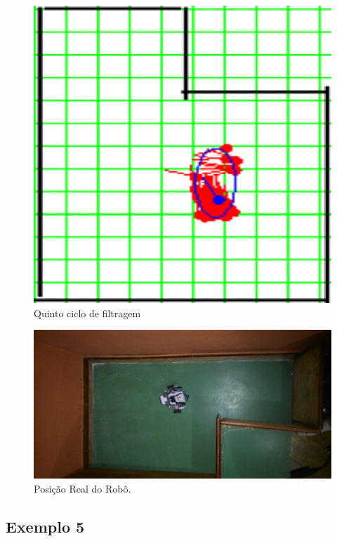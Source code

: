 \begin{figure}[H]
  \centering
  \includegraphics[scale=0.6]{figuras/cen1_ex4/6.eps}
  \caption[Quinto Ciclo de Filtragem]{Quinto ciclo de filtragem}
  \label{img:cen1_ex4_6}
\end{figure}

\begin{figure}[H]
  \centering
  \includegraphics[scale=0.8]{figuras/cen1_ex4/real.eps}
  \caption[Posição real do Robô]{Posição Real do Robô.}
  \label{img:cen1_ex4_6}
\end{figure}

\subsection{Exemplo 5}

